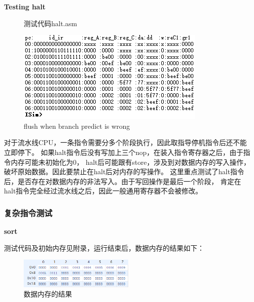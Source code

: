 \documentclass[10pt,a4paper,fleqn]{article}
\begin{document}
\par {\bf Testing halt}
\begin{figure}[H]
  \begin{minipage}{0.4\textwidth}
    测试代码halt.asm
    
  \end{minipage}
  \hspace{1em}
  \begin{minipage}{0.55\textwidth}
    \centering
    \includegraphics[width=\textwidth]{figure/simu/halttest.png}
    \caption{flush when branch predict is wrong}
  \end{minipage}
\end{figure}
\par 对于流水线CPU，一条指令需要分多个阶段执行，因此取指导停机指令后还不能立即停下。
如果halt指令后没有写加上三个nop，在装入指令寄存器之后，由于指令内存可能未初始化为0，
halt后可能跟有store，涉及到对数据内存的写入操作，破坏原始数据。因此要禁止在halt后对内存的写操作。
这里重点测试了halt指令后，是否存在对数据内存的非法写入。由于写回操作是最后一个阶段，
肯定在halt指令完全经过流水线之后，因此一般通用寄存器不会被修改。

\subsubsection{复杂指令测试}
\indent\par {\bf sort}
\par 测试代码及初始内存见附录，运行结束后，数据内存的结果如下：
\begin{figure}[H]
  \centering
  \includegraphics[width=0.5\textwidth]{figure/simu/advance/sort.png}
  \caption{数据内存的结果}
\end{figure}
\end{document}
